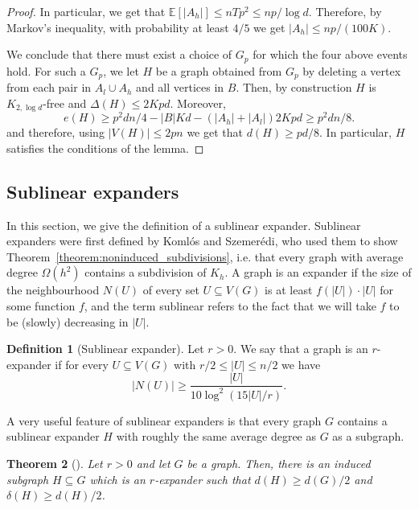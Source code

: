 \documentclass[10pt, a4paper]{article}
\newtheorem{theorem}{Theorem}
\numberwithin{theorem}{section} %
\theoremstyle{remark}
\theoremstyle{definition}
\newtheorem{definition}[theorem]{Definition}
\begin{document}
\begin{proof}
    In particular, we get that $\mathbb{E}[|A_h|] \leq nTp^2 \leq np/\log d$.
    Therefore, by Markov's inequality, with probability at least $4/5$ we get $|A_h| \leq np/(100K)$.

    We conclude that there must exist a choice of $G_p$ for which the four above events hold.
    For such a $G_p$, we let $H$ be a graph obtained from $G_p$ by deleting a vertex from each pair in $A_l \cup A_h$ and all vertices in $B$.
    Then, by construction $H$ is $K_{2, \log d}$-free and $\Delta(H) \leq 2Kpd$.
    Moreover,
    \[
        e(H) \geq p^2dn/4 - |B|Kd - (|A_h| + |A_l|)2Kpd \geq p^2dn/8.
    \]
    and therefore, using $|V(H)| \leq 2pn$ we get that $d(H) \geq pd/8$.
    In particular, $H$ satisfies the conditions of the lemma.
\end{proof}

\subsection{Sublinear expanders}\label{section:sublinear_expanders}
In this section, we give the definition of a sublinear expander.
Sublinear expanders were first defined by Koml\'os and Szemer\'edi, who used them to show Theorem~\ref{theorem:noninduced_subdivisions}, i.e. that every graph with average degree $\Omega(h^2)$ contains a subdivision of $K_h$.
A graph is an expander if the size of the neighbourhood $N(U)$ of every set $U \subseteq V(G)$ is at least $f(|U|) \cdot |U|$ for some function $f$, and the term sublinear refers to the fact that we will take $f$ to be (slowly) decreasing in $|U|$.

\begin{definition}[Sublinear expander]
    Let $r > 0$. We say that a graph is an $r$-expander if for every $U \subseteq V(G)$ with $r/2 \leq |U| \leq n/2$ we have
    \[
        |N(U)| \geq \frac{|U|}{10 \log^2 (15|U|/r)}.
    \]
\end{definition}

A very useful feature of sublinear expanders is that every graph $G$ contains a sublinear expander $H$ with roughly the same average degree as $G$ as a subgraph.

\begin{theorem}[\cite{KomlosSzemeredi96}]\label{theorem:pass_to_expander}
    Let $r > 0$ and let $G$ be a graph.
    Then, there is an induced subgraph $H \subseteq G$ which is an $r$-expander such that $d(H) \geq d (G)/2$ and $\delta(H) \geq d(H)/2$.
\end{theorem}
\end{document}

